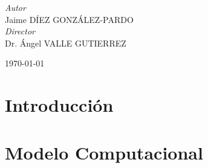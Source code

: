 \documentclass[a4paper, 11pt, oneside]{book}
\begin{document}
\begin{titlepage}
			
				\begin{flushright}
					\large
					\textit{Autor}\\
					Jaime \textsc{DÍEZ GONZÁLEZ-PARDO} \\ %
					\large
					\textit{Director}\\
					Dr. Ángel \textsc{VALLE GUTIERREZ} %
				\end{flushright}
			
			
				\vfill\vfill\vfill %
				
				{\large\today} %
				
			
				\vfill %
		
		\end{titlepage}


		\tableofcontents



			\chapter{Introducción} %
				\label{Intr}

				
				
			\chapter{Modelo Computacional}
				\label{Mdl}
\end{document}
